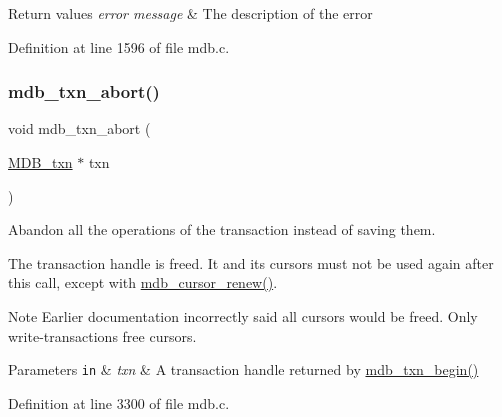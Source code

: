 \begin{DoxyRetVals}{Return values}
{\em error message} & The description of the error \\
\hline
\end{DoxyRetVals}


Definition at line 1596 of file mdb.\+c.

\mbox{\label{group__mdb_ga73a5938ae4c3239ee11efa07eb22b882}} 
\subsubsection{\texorpdfstring{mdb\+\_\+txn\+\_\+abort()}{mdb\_txn\_abort()}}
{\footnotesize\ttfamily void mdb\+\_\+txn\+\_\+abort (\begin{DoxyParamCaption}\item[{\mbox{\hyperlink{struct_m_d_b__txn}{M\+D\+B\+\_\+txn}} $\ast$}]{txn }\end{DoxyParamCaption})}



Abandon all the operations of the transaction instead of saving them. 

The transaction handle is freed. It and its cursors must not be used again after this call, except with \mbox{\hyperlink{group__mdb_gac8b57befb68793070c85ea813df481af}{mdb\+\_\+cursor\+\_\+renew()}}. \begin{DoxyNote}{Note}
Earlier documentation incorrectly said all cursors would be freed. Only write-\/transactions free cursors. 
\end{DoxyNote}

\begin{DoxyParams}[1]{Parameters}
\mbox{\tt in}  & {\em txn} & A transaction handle returned by \mbox{\hyperlink{group__mdb_gad7ea55da06b77513609efebd44b26920}{mdb\+\_\+txn\+\_\+begin()}} \\
\hline
\end{DoxyParams}


Definition at line 3300 of file mdb.\+c.

\mbox{\label{group__mdb_gad7ea55da06b77513609efebd44b26920}} 
